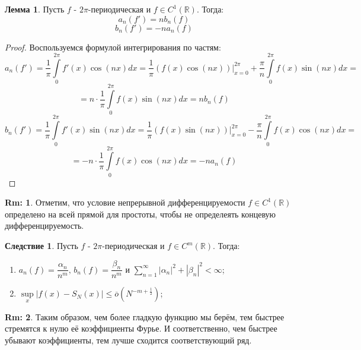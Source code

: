 \documentclass[12pt]{article}
\newcommand{\MR}{\mathbb{R}}
\theoremstyle{definition}
\newtheorem{rem}{Rm:}
\newtheorem{lemma}{Лемма}
\newtheorem{corollary}{Следствие}
\newcommand{\ddsum}[2]{\displaystyle\sum\limits_{#1}^{#2}}
\newcommand{\ddint}[2]{\displaystyle\int\limits_{#1}^{#2}}
\begin{document}
\begin{lemma}
	Пусть $f$ - $2\pi$-периодическая и $f\in C^1(\MR)$. Тогда: 
	$$
		a_n(f') = nb_n(f)
	$$
	$$	
		b_n(f') = -n a_n(f)
	$$
\end{lemma}
\begin{proof}
	Воспользуемся формулой интегрирования по частям:
	$$
		a_n(f') = \dfrac{1}{\pi}\ddint{0}{2\pi}f'(x)\cos{(nx)}dx = \dfrac{1}{\pi}\left(f(x)\cos{(nx)}\right)\biggl|_{x = 0}^{2\pi} + \dfrac{\pi}{n}\ddint{0}{2\pi}f(x)\sin{(nx)}dx = 
	$$
	$$
		= n{\cdot}\dfrac{1}{\pi}\ddint{0}{2\pi}f(x)\sin{(nx)}dx = nb_n(f)
	$$
	$$
		b_n(f') = \dfrac{1}{\pi}\ddint{0}{2\pi}f'(x)\sin{(nx)}dx = \dfrac{1}{\pi}\left(f(x)\sin{(nx)}\right)\biggl|_{x = 0}^{2\pi} - \dfrac{\pi}{n}\ddint{0}{2\pi}f(x)\cos{(nx)}dx = 
	$$
	$$
		= -n{\cdot}\dfrac{1}{\pi}\ddint{0}{2\pi}f(x)\cos{(nx)}dx = -na_n(f)
	$$
\end{proof}
\begin{rem}
	Отметим, что условие непрерывной дифференцируемости $f \in C^1(\MR)$ определено на всей прямой для простоты, чтобы не определеять концевую дифференцируемость.
\end{rem}
\begin{corollary}
	Пусть $f$ - $2\pi$-периодическая и $f\in C^m(\MR)$. Тогда: 
	\begin{enumerate}[label=\arabic*)]
		\item $a_n(f) = \dfrac{\alpha_n}{n^m}, \, b_n(f) = \dfrac{\beta_n}{n^m}$ и $\ddsum{n = 1}{\infty}|\alpha_n|^2 + |\beta_n|^2 < \infty$;
		\item $\sup\limits_{x}|f(x) - S_N(x)| \leq \overline{o}\left(N^{-m +\tfrac{1}{2}}\right)$;
	\end{enumerate}
\end{corollary}
\begin{rem}
	Таким образом, чем более гладкую функцию мы берём, тем быстрее стремятся к нулю её коэффициенты Фурье. И соответственно, чем быстрее убывают коэффициенты, тем лучше сходится соответствующий ряд.
\end{rem}
\end{document}
